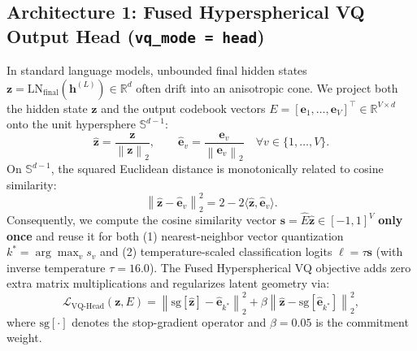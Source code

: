 \documentclass[11pt,a4paper]{article}
\newcommand{\norm}[1]{\left\lVert#1\right\rVert}
\newcommand{\R}{\mathbb{R}}
\newcommand{\Sphere}{\mathbb{S}^{d-1}}
\begin{document}
\subsection{Architecture 1: Fused Hyperspherical VQ Output Head (\texttt{vq\_mode = head})}
In standard language models, unbounded final hidden states $\bm{z} = \text{LN}_{\text{final}}(\bm{h}^{(L)}) \in \R^d$ often drift into an anisotropic cone. We project both the hidden state $\bm{z}$ and the output codebook vectors $E = [\bm{e}_1, \dots, \bm{e}_V]^\top \in \R^{V \times d}$ onto the unit hypersphere $\Sphere$:
\begin{equation}
    \hat{\bm{z}} = \frac{\bm{z}}{\norm{\bm{z}}_2}, \qquad \hat{\bm{e}}_v = \frac{\bm{e}_v}{\norm{\bm{e}_v}_2} \quad \forall v \in \{1, \dots, V\}.
\end{equation}
On $\Sphere$, the squared Euclidean distance is monotonically related to cosine similarity:
\begin{equation}
    \norm{\hat{\bm{z}} - \hat{\bm{e}}_v}_2^2 = 2 - 2\langle \hat{\bm{z}}, \hat{\bm{e}}_v \rangle.
\end{equation}
Consequently, we compute the cosine similarity vector $\bm{s} = \hat{E}\hat{\bm{z}} \in [-1, 1]^V$ \textbf{only once} and reuse it for both (1) nearest-neighbor vector quantization $k^* = \arg\max_v s_v$ and (2) temperature-scaled classification logits $\bm{\ell} = \tau \bm{s}$ (with inverse temperature $\tau = 16.0$). The Fused Hyperspherical VQ objective adds zero extra matrix multiplications and regularizes latent geometry via:
\begin{equation}
    \mathcal{L}_{\text{VQ-Head}}(\bm{z}, E) = \norm{\text{sg}[\hat{\bm{z}}] - \hat{\bm{e}}_{k^*}}_2^2 + \beta \norm{\hat{\bm{z}} - \text{sg}[\hat{\bm{e}}_{k^*}]}_2^2,
\end{equation}
where $\text{sg}[\cdot]$ denotes the stop-gradient operator and $\beta = 0.05$ is the commitment weight.
\end{document}

